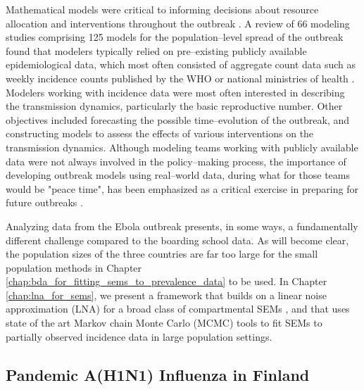 Mathematical models were critical to informing decisions about resource allocation and interventions throughout the outbreak \cite{coltart2017ebola}. A review of 66 modeling studies comprising 125 models for the population--level spread of the outbreak found that modelers typically relied on pre--existing publicly available epidemiological data, which most often consisted of aggregate count data such as weekly incidence counts published by the WHO or national ministries of health \cite{chretien2015mathematical}. Modelers working with incidence data were most often interested in describing the transmission dynamics, particularly the basic reproductive number. Other objectives included forecasting the possible time--evolution of the outbreak, and constructing models to assess the effects of various interventions on the transmission dynamics. Although modeling teams working with publicly available data were not always involved in the policy--making process, the importance of developing outbreak models using real--world data, during what for those teams would be "peace time", has been emphasized as a critical exercise in preparing for future outbreaks \cite{viboud2018rapidd}.

Analyzing data from the Ebola outbreak presents, in some ways, a fundamentally different challenge compared to the boarding school data. As will become clear, the population sizes of the three countries are far too large for the small population methods in Chapter \ref{chap:bda_for_fitting_sems_to_prevalence_data} to be used. In Chapter \ref{chap:lna_for_sems}, we present a framework that builds on a linear noise approximation (LNA) for a broad class of compartmental SEMs \cite{fearnhead2014,komorowski2009,ross2009parameter,wilkinson2011stochastic}, and that uses state of the art Markov chain Monte Carlo (MCMC) tools to fit SEMs to partially observed incidence data in large population settings. 

\subsection{Pandemic A(H1N1) Influenza in Finland}
\label{subsec:flu_description}

